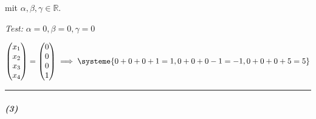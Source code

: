 \documentclass[a4paper,12pt]{article}
\begin{document}
mit $\alpha,\beta,\gamma\in\mathbb R$.

\emph{Test: }$\alpha=0,\beta=0,\gamma=0$

\[
    \begin{pmatrix}
        x_1 \\x_2\\x_3\\x_4
    \end{pmatrix}=\begin{pmatrix}
        0 \\0\\0\\1
    \end{pmatrix}\implies\systeme{
        0+0+0+1=1,
        0+0+0-1=-1,
        0+0+0+5=5
    }
\]

\noindent\rule{\textwidth}{0.4pt}

\subparagraph{(3)}
\end{document}
